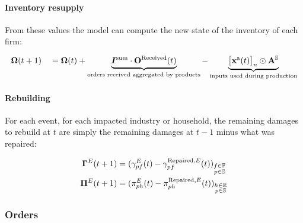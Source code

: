 

\paragraph{Inventory resupply}
\label{sec:inventory-resupply}


From these values the model can compute the new state of the inventory of each
firm:

\begin{alignat*}{4}
  &\mathbf{\Omega}(t+1) &&= \mathbf{\Omega}(t) + \underbrace{ \bm{I}^{\textrm{sum}} \cdot
                  \mathbf{O}^{\textrm{Received}}(t) }_{\text{orders received
                  aggregated by products}} - \underbrace{\begin{bmatrix} \mathbf{x}^{\textrm{a}}(t) \end{bmatrix}_{n} \odot \mathbf{A}^{\mathbb{S}}}_{\text{inputs used during production}}\\
\end{alignat*}

\paragraph{Rebuilding}
\label{sec:rebuilding}


For each event, for each impacted industry or household, the remaining damages
to rebuild at $t$ are simply the remaining damages at $t-1$ minus what was repaired:

\begin{align*}
  \mathbf{\Gamma}^{E}(t+1) &= (\gamma^{E}_{pf}(t) - \gamma^{\textrm{Repaired},E}_{pf}(t) )_{\substack{f \in \mathbb{F}\\p \in \mathbb{S}}}\\
  \bm{\Pi}^{E}(t+1) &= (\pi^{E}_{ph}(t) - \pi^{\textrm{Repaired},E}_{ph}(t))_{\substack{h \in \mathbb{R}\\p \in \mathbb{S}}}\\
\end{align*}

\subsubsection{Orders}
\label{par:orders_sh}

